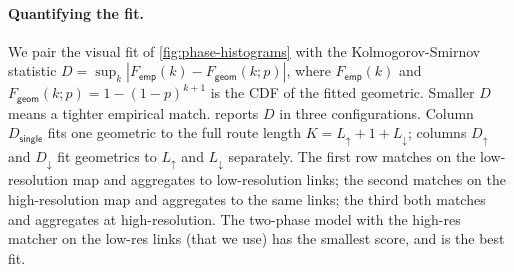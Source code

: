 \documentclass[sigconf, review]{acmart}
\begin{document}


\paragraph{Quantifying the fit.}
We pair the visual fit of \cref{fig:phase-histograms} with the
Kolmogorov-Smirnov statistic
$D = \sup_{k} \left| F_{\textsf{emp}}(k) - F_{\textsf{geom}}(k; p) \right|$,
where $F_{\textsf{emp}}(k)$
and $F_{\textsf{geom}}(k; p) = 1 - (1 - p)^{k+1}$ 
is the CDF of the fitted geometric.  
Smaller $D$ means a tighter empirical match.  reports $D$ in three configurations.
Column $D_{\textsf{single}}$ fits one geometric to the full route length $K = L_{\uparrow} + 1 + L_{\downarrow}$; columns
$D_{\uparrow}$ and $D_{\downarrow}$ fit geometrics to
$L_{\uparrow}$ and $L_{\downarrow}$ separately. The first row
matches on the low-resolution map and aggregates to
low-resolution links; the second matches on the
high-resolution map and aggregates to the same links; the
third both matches and aggregates at high-resolution.
The two-phase model with the high-res matcher on the low-res links (that we use) has the smallest score, and is the best fit.  
\end{document}

